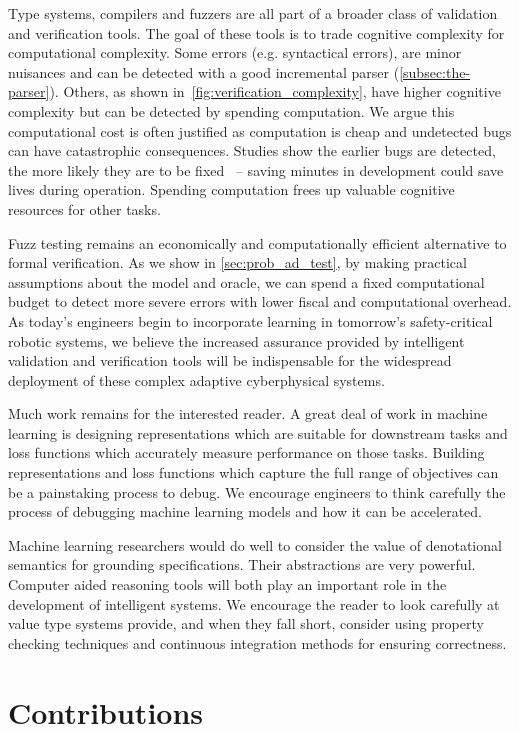 Type systems, compilers and fuzzers are all part of a broader class of validation and verification tools. The goal of these tools is to trade cognitive complexity for computational complexity. Some errors (e.g. syntactical errors), are minor nuisances and can be detected with a good incremental parser (\autoref{subsec:the-parser}). Others, as shown in~\autoref{fig:verification_complexity}, have higher cognitive complexity but can be detected by spending computation. We argue this computational cost is often justified as computation is cheap and undetected bugs can have catastrophic consequences. Studies show the earlier bugs are detected, the more likely they are to be fixed~\citep{distefano2019scaling} -- saving minutes in development could save lives during operation. Spending computation frees up valuable cognitive resources for other tasks.

Fuzz testing remains an economically and computationally efficient alternative to formal verification. As we show in \autoref{sec:prob_ad_test}, by making practical assumptions about the model and oracle, we can spend a fixed computational budget to detect more severe errors with lower fiscal and computational overhead. As today's engineers begin to incorporate learning in tomorrow's safety-critical robotic systems, we believe the increased assurance provided by intelligent validation and verification tools will be indispensable for the widespread deployment of these complex adaptive cyberphysical systems.

Much work remains for the interested reader. A great deal of work in machine learning is designing representations which are suitable for downstream tasks and loss functions which accurately measure performance on those tasks. Building representations and loss functions which capture the full range of objectives can be a painstaking process to debug. We encourage engineers to think carefully the process of debugging machine learning models and how it can be accelerated.

Machine learning researchers would do well to consider the value of denotational semantics for grounding specifications. Their abstractions are very powerful. Computer aided reasoning tools will both play an important role in the development of intelligent systems. We encourage the reader to look carefully at value type systems provide, and when they fall short, consider using property checking techniques and continuous integration methods for ensuring correctness.

\section{Contributions}

